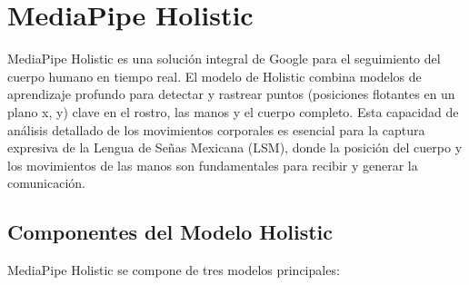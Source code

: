\section{MediaPipe Holistic}

MediaPipe Holistic es una solución integral de Google para el seguimiento del cuerpo humano en tiempo real. El modelo de Holistic combina  modelos de aprendizaje profundo para detectar y rastrear puntos (posiciones flotantes en un  plano x, y) clave en el rostro, las manos y el cuerpo completo. Esta capacidad de análisis detallado de los movimientos corporales es esencial para la captura expresiva de la Lengua de Señas Mexicana (LSM), donde la posición del cuerpo y los movimientos de las manos son fundamentales para recibir y generar la comunicación.

\subsection{Componentes del Modelo Holistic}

MediaPipe Holistic se compone de tres modelos principales:

